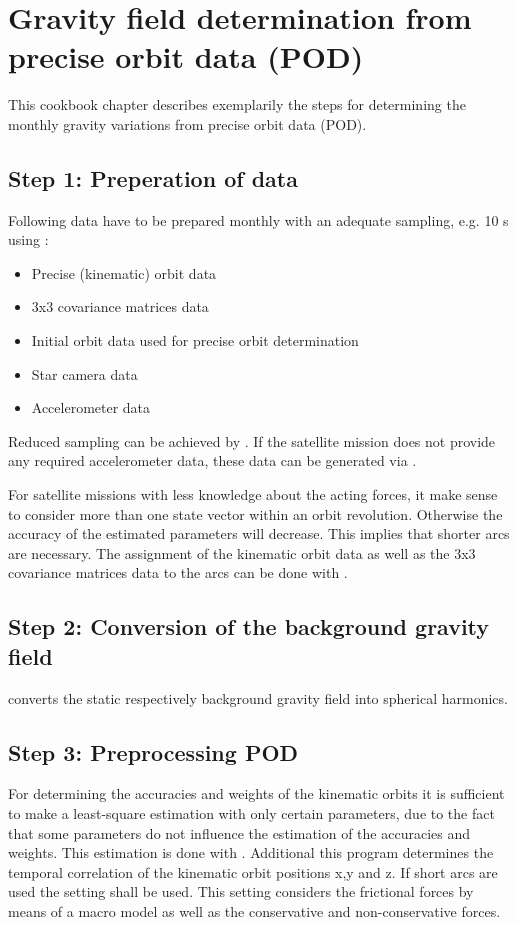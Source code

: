 \section{Gravity field determination from precise orbit data (POD)}\label{cookbook.gravityFieldPod}

This cookbook chapter describes exemplarily the steps for determining the monthly gravity variations from precise orbit data (POD).

\subsection{Step 1: Preperation of data}

Following data have to be prepared monthly with an adequate sampling, e.g. 10 s using
:
\begin{itemize}
  \item Precise (kinematic) orbit data
  \item 3x3 covariance matrices data
  \item Initial orbit data used for precise orbit determination
  \item Star camera data
  \item Accelerometer data
\end{itemize}
Reduced sampling can be achieved by . If the satellite mission does not provide any required
accelerometer data, these data can be generated via .

For satellite missions with less knowledge about the acting forces, it make sense to consider more than one state vector within an orbit revolution.
Otherwise the accuracy of the estimated parameters will decrease. This implies that shorter arcs are necessary. The assignment of the kinematic orbit
data as well as the 3x3 covariance matrices data to the arcs can be done with .

\subsection{Step 2: Conversion of the background gravity field}
 converts the static respectively background gravity field into spherical harmonics.

\subsection{Step 3: Preprocessing POD}
For determining the accuracies and weights of the kinematic orbits it is sufficient to make a least-square estimation with only certain parameters, due
to the fact that some parameters do not influence the estimation of the accuracies and weights.
This estimation is done with . Additional this program determines the temporal correlation of the kinematic orbit positions
x,y and z. If short arcs are used the setting  shall be used. This setting
considers the frictional forces by means of a macro model as well as the conservative and non-conservative forces.

